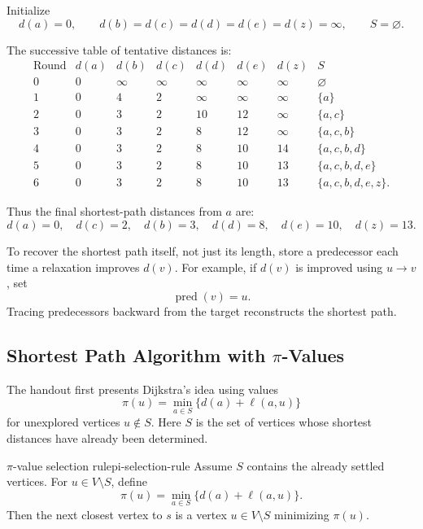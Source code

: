 \begin{examplebox}[title={Dijkstra from source \(a\)}]
Initialize
\[
d(a)=0,\qquad d(b)=d(c)=d(d)=d(e)=d(z)=\infty,
\qquad S=\varnothing.
\]

The successive table of tentative distances is:
\[
\begin{array}{c|cccccc|c}
\text{Round} & d(a)&d(b)&d(c)&d(d)&d(e)&d(z)&S\\ \hline
0 &0&\infty&\infty&\infty&\infty&\infty&\varnothing\\
1 &0&4&2&\infty&\infty&\infty&\{a\}\\
2 &0&3&2&10&12&\infty&\{a,c\}\\
3 &0&3&2&8&12&\infty&\{a,c,b\}\\
4 &0&3&2&8&10&14&\{a,c,b,d\}\\
5 &0&3&2&8&10&13&\{a,c,b,d,e\}\\
6 &0&3&2&8&10&13&\{a,c,b,d,e,z\}.
\end{array}
\]

Thus the final shortest-path distances from \(a\) are:
\[
d(a)=0,\quad d(c)=2,\quad d(b)=3,\quad d(d)=8,\quad d(e)=10,\quad d(z)=13.
\]
\end{examplebox}

\begin{extension}[title={Recovering actual shortest paths}]
To recover the shortest path itself, not just its length, store a predecessor each time a relaxation improves \(d(v)\). For example, if \(d(v)\) is improved using \(u\to v\), set
\[
\operatorname{pred}(v)=u.
\]
Tracing predecessors backward from the target reconstructs the shortest path.
\end{extension}

\subsection{Shortest Path Algorithm with \(\pi\)-Values}

The handout first presents Dijkstra's idea using values
\[
\pi(u)=\min_{a\in S}\{d(a)+\ell(a,u)\}
\]
for unexplored vertices \(u\notin S\). Here \(S\) is the set of vertices whose shortest distances have already been determined.

\begin{theorem}{\(\pi\)-value selection rule}{pi-selection-rule}
Assume \(S\) contains the already settled vertices. For \(u\in V\setminus S\), define
\[
\pi(u)=\min_{a\in S}\{d(a)+\ell(a,u)\}.
\]
Then the next closest vertex to \(s\) is a vertex \(u\in V\setminus S\) minimizing \(\pi(u)\).
\end{theorem}

